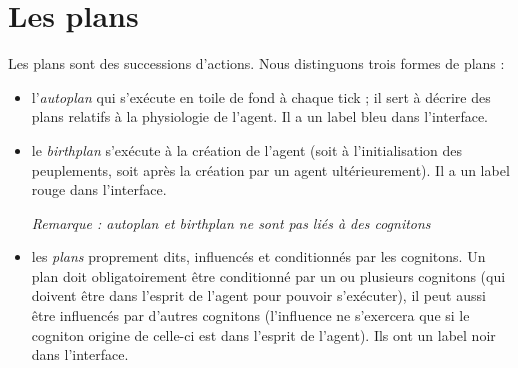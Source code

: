 
\section{Les plans}

Les plans sont des successions d'actions.
Nous distinguons trois formes de plans :
\begin{itemize}
\item  l'\textit{autoplan} qui s'exécute en toile de fond à chaque tick ; il sert à décrire des plans relatifs à la physiologie de l'agent. Il a un label bleu dans l'interface.
\item le\textit{ birthplan} s'exécute à la création de l'agent (soit à l'initialisation des peuplements, soit après la création par un agent ultérieurement). Il a un label rouge dans l'interface.

\textit{Remarque : autoplan et birthplan ne sont pas liés à des cognitons}
\item les \textit{plans} proprement dits, influencés et conditionnés par les cognitons. Un plan doit obligatoirement être conditionné par un ou plusieurs cognitons (qui doivent être dans l'esprit de l'agent pour pouvoir s'exécuter), il peut aussi être influencés par d'autres cognitons (l'influence ne s'exercera que si le cogniton origine de celle-ci est dans l'esprit de l'agent). Ils ont un label noir dans l'interface.
\end{itemize}



	
	
	